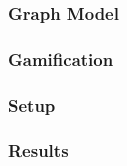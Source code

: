 \subsubsection{Graph Model} 

\subsubsection{Gamification}

\subsubsection{Setup}
\subsubsection{Results} 

